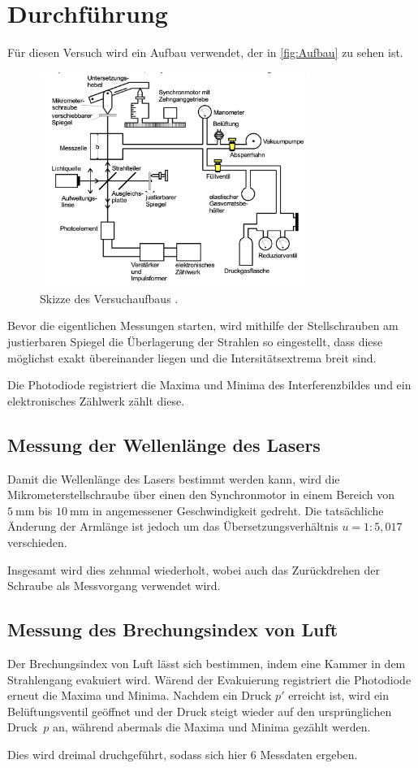 \section{Durchführung}
\label{sec:Durchführung}
Für diesen Versuch wird ein Aufbau verwendet, der in \autoref{fig:Aufbau} zu sehen ist.
\begin{figure}[H]
    \centering
    \includegraphics[height=7cm]{content/pics/Aufbau.png}
    \caption{Skizze des Versuchaufbaus \cite{v401}.}
    \label{fig:Aufbau}
  \end{figure}
Bevor die eigentlichen Messungen starten, wird mithilfe der Stellschrauben am justierbaren Spiegel die Überlagerung
der Strahlen so eingestellt, dass diese möglichst exakt übereinander liegen und die Intersitätsextrema breit sind.

Die Photodiode registriert die Maxima und Minima des Interferenzbildes und ein elektronisches Zählwerk zählt diese.

\subsection{Messung der Wellenlänge des Lasers}
Damit die Wellenlänge des Lasers bestimmt werden kann, wird die Mikrometerstellschraube über einen den Synchronmotor in
einem Bereich von $\qty{5}{\milli\metre}$ bis $\qty{10}{\milli\metre}$ in angemessener Geschwindigkeit gedreht. Die 
tatsächliche Änderung der Armlänge ist jedoch um das Übersetzungsverhältnis $u = 1:5,017$ verschieden.

Insgesamt wird dies zehnmal wiederholt, wobei auch das Zurückdrehen der Schraube als Messvorgang verwendet wird.

\subsection{Messung des Brechungsindex von Luft}
Der Brechungsindex von Luft lässt sich bestimmen, indem eine Kammer in dem Strahlengang evakuiert wird. Wärend der Evakuierung
registriert die Photodiode erneut die Maxima und Minima.
Nachdem ein Druck $p'$ erreicht ist, wird ein Belüftungsventil geöffnet und der Druck steigt wieder auf den ursprünglichen 
Druck~$p$ an, während abermals die Maxima und Minima gezählt werden.

Dies wird dreimal druchgeführt, sodass sich hier 6 Messdaten ergeben.